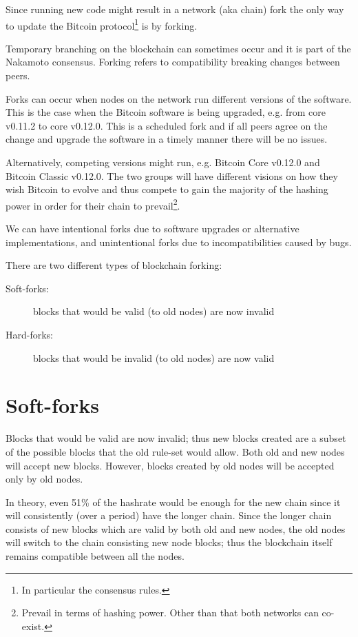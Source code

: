 Since running new code might result in a network (aka chain) fork the only way to update the Bitcoin protocol\footnote{In particular the consensus rules.} is by forking.

\begin{note}
Temporary branching on the blockchain can sometimes occur and it is part of the Nakamoto consensus. Forking refers to compatibility breaking changes between peers.
\end{note}

Forks can occur when nodes on the network run different versions of the software. This is the case when the Bitcoin software is being upgraded, e.g. from core v0.11.2 to core v0.12.0. This is a scheduled fork and if all peers agree on the change and upgrade the software in a timely manner there will be no issues.

Alternatively, competing versions might run, e.g. Bitcoin Core v0.12.0 and Bitcoin Classic v0.12.0. The two groups will have different visions on how they wish Bitcoin to evolve and thus compete to gain the majority of the hashing power in order for their chain to prevail\footnote{Prevail in terms of hashing power. Other than that both networks can co-exist.}.

We can have intentional forks due to software upgrades or alternative implementations, and unintentional forks due to incompatibilities caused by bugs.

There are two different types of blockchain forking:
\begin{description}
\item[Soft-forks:] blocks that would be valid (to old nodes) are now invalid
\item[Hard-forks:] blocks that would be invalid (to old nodes) are now valid
\end{description}


\section{Soft-forks}
Blocks that would be valid are now invalid; thus new blocks created are a subset of the possible blocks that the old rule-set would allow. Both old and new nodes will accept new blocks. However, blocks created by old nodes will be accepted only by old nodes.

In theory, even 51\% of the hashrate would be enough for the new chain since it will consistently (over a period) have the longer chain. Since the longer chain consists of new blocks which are valid by both old and new nodes, the old nodes will switch to the chain consisting new node blocks; thus the blockchain itself remains compatible between all the nodes.

